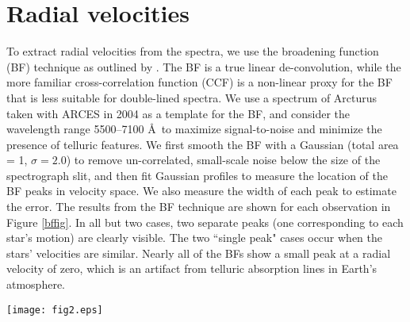 \section{Radial velocities}\label{rvs}
To extract radial velocities from the spectra, we use the broadening function (BF) technique as outlined by \citet{ruc02}. The BF is a true linear de-convolution, while the more familiar cross-correlation function (CCF) is a non-linear proxy for the BF that is less suitable for double-lined spectra. We use a spectrum of Arcturus taken with ARCES in 2004 as a template for the BF, and consider the wavelength range 5500--7100 \AA \ to maximize signal-to-noise and minimize the presence of telluric features. We first smooth the BF with a Gaussian (total area = 1, $\sigma=2.0$)  to remove un-correlated, small-scale noise below the size of the spectrograph slit, and then fit Gaussian profiles to measure the location of the BF peaks in velocity space. We also measure the width of each peak to estimate the error. The results from the BF technique are shown for each observation in Figure \ref{bffig}. In all but two cases, two separate peaks (one corresponding to each star's motion) are clearly visible. The two ``single peak" cases occur when the stars' velocities are similar. Nearly all of the BFs show a small peak at a radial velocity of zero, which is an artifact from telluric absorption lines in Earth's atmosphere.

\begin{figure*}[h!]
\centering
\texttt{[image: fig2.eps]}
\caption{Raw radial velocities fit with broadening functions.\label{bffig}}
\end{figure*}

